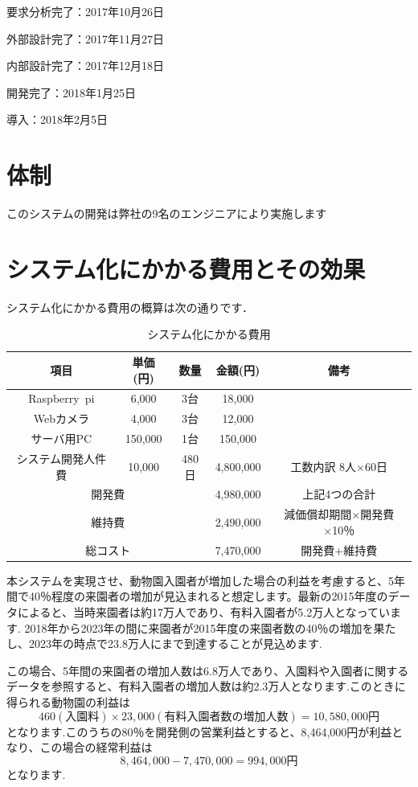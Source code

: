 \documentclass[a4j]{jarticle}
\begin{document}
要求分析完了：2017年10月26日

外部設計完了：2017年11月27日

内部設計完了：2017年12月18日

開発完了：2018年1月25日

導入：2018年2月5日

\section{体制}
このシステムの開発は弊社の9名のエンジニアにより実施します


\section{システム化にかかる費用とその効果}
システム化にかかる費用の概算は次の通りです．
\begin{table}[H]
  \caption{システム化にかかる費用}
  \begin{center}
    \begin{tabular}{|c|c|c|c|c|} \hline
      項目&単価(円)&数量&金額(円)&備考 \\ \hline
      Raspberry~pi&6,000&3台&18,000&　\\ \hline
      Webカメラ&4,000&3台&12,000&　\\ \hline
      サーバ用PC&150,000&1台&150,000&　\\ \hline
      システム開発人件費&10,000&480日&4,800,000&工数内訳 8人×60日 \\ \hline
      \multicolumn{3}{|c|}{開発費}&4,980,000&上記4つの合計 \\ \hline
      \multicolumn{3}{|c|}{維持費}&2,490,000&減価償却期間×開発費×10％ \\ \hline %
      \multicolumn{3}{|c|}{総コスト}&7,470,000&開発費+維持費 \\ \hline
    \end{tabular}
  \end{center}
\end{table}
本システムを実現させ、動物園入園者が増加した場合の利益を考慮すると、5年間で40％程度の来園者の増加が見込まれると想定します。最新の2015年度のデータによると、当時来園者は約17万人であり、有料入園者が5.2万人となっています\cite{ref3}.
2018年から2023年の間に来園者が2015年度の来園者数の40％の増加を果たし、2023年の時点で23.8万人にまで到達することが見込めます.

この場合、5年間の来園者の増加人数は6.8万人であり、入園料や入園者に関するデータ\cite{ref2}\cite{ref3}を参照すると、有料入園者の増加人数は約2.3万人となります.このときに得られる動物園の利益は
\[460(入園料) \times 23,000(有料入園者数の増加人数) = 10,580,000円\]
となります.このうちの80％を開発側の営業利益とすると、8,464,000円が利益となり、この場合の経常利益は\[8,464,000-7,470,000=994,000円\]となります.
\end{document}
